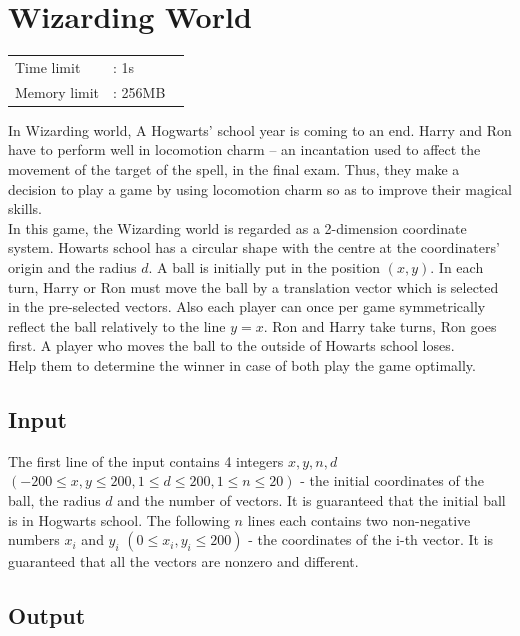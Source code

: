 \documentclass[12pt]{article}
\begin{document}
	\section{Wizarding World}
	
	\vspace{-0.5cm}
	\begin{table}[!h]
		\hspace{1cm}
		\begin{tabular}{ll}
			Time limit  &:  1s        \\
			Memory limit &:  256MB         \
		\end{tabular}
	\end{table}
	
	  In Wizarding world, A Hogwarts’ school year is coming to an end. Harry and Ron have to perform well in locomotion charm – an incantation used to affect the movement of the target of the spell, in the final exam. Thus, they make a decision to play a game by using locomotion charm so as to improve their magical skills.\\
      In this game, the Wizarding world is regarded as a 2-dimension coordinate system. Howarts school has a circular shape with the centre at the coordinaters’ origin and the radius $d$. A ball is initially put in the position $(x, y)$. In each turn, Harry or Ron must move the ball by a translation vector which is selected in the pre-selected vectors. Also each player can once per game symmetrically reflect the ball relatively to the line $y=x$. Ron and Harry take turns, Ron goes first. A player who moves the ball to the outside of Howarts school loses.\\
      Help them to determine the winner in case of both play the game optimally.
	\subsection*{Input}
	
	The first line of the input contains 4 integers $x, y, n, d$ $(-200 \le x, y \le 200, 1 \le d \le 200, 1 \le n \le 20)$ - the initial coordinates of the ball, the radius $d$ and the number of vectors. It is guaranteed that the initial ball is in Hogwarts school. The following $n$ lines each contains two non-negative numbers $x_i$ and $y_i$ $(0 \le x_i, y_i \le 200)$ - the coordinates of the i-th vector. It is guaranteed that all the vectors are nonzero and different. 
	
	\subsection*{Output}
	
\end{document}
